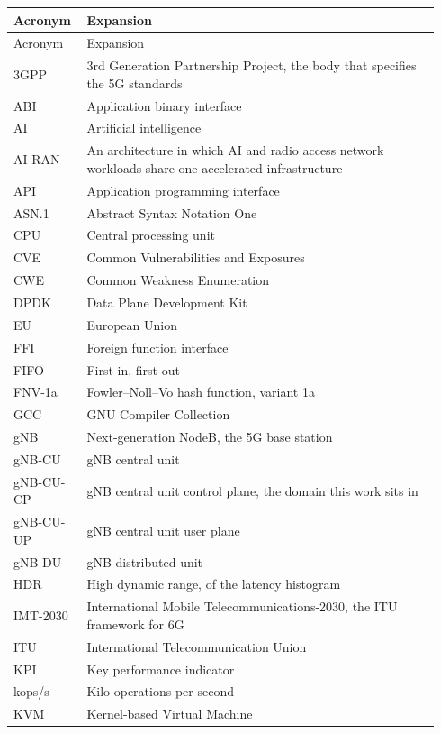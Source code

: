 \documentclass[english,oneside,a4paper,censored,csm,software-track-2020]{HYthesisML}
\begin{document}
\begingroup
\singlespacing
\footnotesize
\renewcommand{\arraystretch}{1.15}
\begin{longtable}{@{}p{0.15\linewidth} p{0.79\linewidth}@{}}
\hline\hline
Acronym & Expansion \\
\hline
\endfirsthead
\hline\hline
Acronym & Expansion \\
\hline
\endhead
3GPP & 3rd Generation Partnership Project, the body that specifies the 5G standards \\
ABI & Application binary interface \\
AI & Artificial intelligence \\
AI-RAN & An architecture in which AI and radio access network workloads share one accelerated infrastructure \\
API & Application programming interface \\
ASN.1 & Abstract Syntax Notation One \\
CPU & Central processing unit \\
CVE & Common Vulnerabilities and Exposures \\
CWE & Common Weakness Enumeration \\
DPDK & Data Plane Development Kit \\
EU & European Union \\
FFI & Foreign function interface \\
FIFO & First in, first out \\
FNV-1a & Fowler--Noll--Vo hash function, variant 1a \\
GCC & GNU Compiler Collection \\
gNB & Next-generation NodeB, the 5G base station \\
gNB-CU & gNB central unit \\
gNB-CU-CP & gNB central unit control plane, the domain this work sits in \\
gNB-CU-UP & gNB central unit user plane \\
gNB-DU & gNB distributed unit \\
HDR & High dynamic range, of the latency histogram \\
IMT-2030 & International Mobile Telecommunications-2030, the ITU framework for 6G \\
ITU & International Telecommunication Union \\
KPI & Key performance indicator \\
kops/s & Kilo-operations per second \\
KVM & Kernel-based Virtual Machine \\

\end{longtable}
\end{document}
